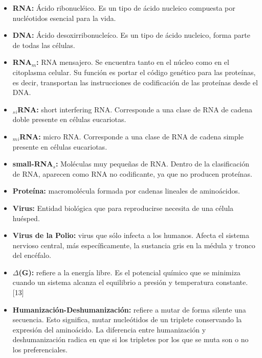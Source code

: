 \documentclass[12pt,a4paper,english,spanish]{article}
\begin{document}
\begin{itemize}
	\item \textbf{RNA:} Ácido ribonucléico. Es un tipo de ácido nucleico compuesta por nucléotidos esencial para la vida.
	\item \textbf{DNA:} Ácido desoxirribonucleíco. Es un tipo de ácido nucleico, forma parte de todas las células.
	\item \textbf{RNA$_m$:} RNA mensajero. Se encuentra tanto en el núcleo como en el citoplasma celular. Su función es portar el código genético para
							las proteínas, es decir, transportan las instrucciones de codificación de las proteínas desde el DNA.
	\item \textbf{$_s$$_i$RNA:} short interfering RNA. Corresponde a una clase de RNA de cadena doble presente en células eucariotas.
	\item \textbf{$_m$$_i$RNA:} micro RNA. Corresponde a una clase de RNA de cadena simple presente en células eucariotas. 
	\item \textbf{small-RNA$_s$:} Moléculas muy pequeñas de RNA. Dentro de la clasificación de RNA, aparecen como RNA no codificante, ya que no producen 									proteínas.
	\item \textbf{Proteína:} macromolécula formada por cadenas lineales de aminoácidos.
	\item \textbf{Virus:} Entidad biológica que para reproducirse necesita de una célula huésped.	
	\item \textbf{Virus de la Polio:} virus que sólo infecta a los humanos. Afecta el sistema nervioso central, más específicamente, la sustancia gris en 										la médula y tronco del encéfalo.  
	\item \textbf{$\Delta$(G):} refiere a la energía libre. Es el potencial químico que se minimiza cuando un sistema alcanza el equilibrio a presión y 								temperatura constante. [13] 
	\item \textbf{Humanización-Deshumanización:} refiere a mutar de forma silente una secuencia. Esto significa, mutar nucleótidos de un triplete 													conservando la expresión del aminoácido. La diferencia entre humanización y deshumanización radica en que 													si los tripletes por los que se muta son o no los preferenciales.				


\end{itemize}
\end{document}
